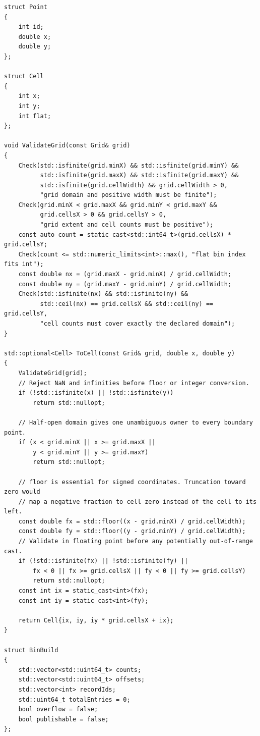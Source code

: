 \begin{verbatim}
struct Point
{
    int id;
    double x;
    double y;
};

struct Cell
{
    int x;
    int y;
    int flat;
};

void ValidateGrid(const Grid& grid)
{
    Check(std::isfinite(grid.minX) && std::isfinite(grid.minY) &&
          std::isfinite(grid.maxX) && std::isfinite(grid.maxY) &&
          std::isfinite(grid.cellWidth) && grid.cellWidth > 0,
          "grid domain and positive width must be finite");
    Check(grid.minX < grid.maxX && grid.minY < grid.maxY &&
          grid.cellsX > 0 && grid.cellsY > 0,
          "grid extent and cell counts must be positive");
    const auto count = static_cast<std::int64_t>(grid.cellsX) * grid.cellsY;
    Check(count <= std::numeric_limits<int>::max(), "flat bin index fits int");
    const double nx = (grid.maxX - grid.minX) / grid.cellWidth;
    const double ny = (grid.maxY - grid.minY) / grid.cellWidth;
    Check(std::isfinite(nx) && std::isfinite(ny) &&
          std::ceil(nx) == grid.cellsX && std::ceil(ny) == grid.cellsY,
          "cell counts must cover exactly the declared domain");
}

std::optional<Cell> ToCell(const Grid& grid, double x, double y)
{
    ValidateGrid(grid);
    // Reject NaN and infinities before floor or integer conversion.
    if (!std::isfinite(x) || !std::isfinite(y))
        return std::nullopt;

    // Half-open domain gives one unambiguous owner to every boundary point.
    if (x < grid.minX || x >= grid.maxX ||
        y < grid.minY || y >= grid.maxY)
        return std::nullopt;

    // floor is essential for signed coordinates. Truncation toward zero would
    // map a negative fraction to cell zero instead of the cell to its left.
    const double fx = std::floor((x - grid.minX) / grid.cellWidth);
    const double fy = std::floor((y - grid.minY) / grid.cellWidth);
    // Validate in floating point before any potentially out-of-range cast.
    if (!std::isfinite(fx) || !std::isfinite(fy) ||
        fx < 0 || fx >= grid.cellsX || fy < 0 || fy >= grid.cellsY)
        return std::nullopt;
    const int ix = static_cast<int>(fx);
    const int iy = static_cast<int>(fy);

    return Cell{ix, iy, iy * grid.cellsX + ix};
}

struct BinBuild
{
    std::vector<std::uint64_t> counts;
    std::vector<std::uint64_t> offsets;
    std::vector<int> recordIds;
    std::uint64_t totalEntries = 0;
    bool overflow = false;
    bool publishable = false;
};


\end{verbatim}
